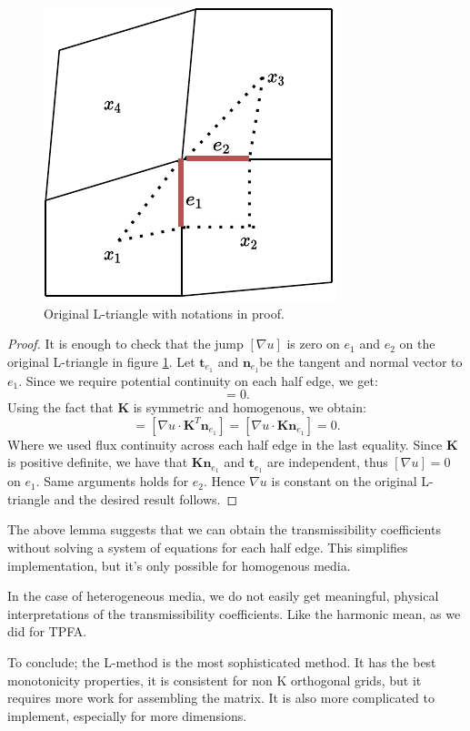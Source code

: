 \documentclass[../Main/main.tex]{subfiles}
\begin{document}
	\begin{figure}[H]
		\centering
		\includegraphics{right choice 2.pdf}	
		\caption{Original L-triangle with notations in proof.}
		\label{fig:original right choice}
	\end{figure}
	\begin{proof}
		It is enough to check that the jump $[\nabla u]$ is zero on $e_1$ and $e_2$ on the original L-triangle in figure \ref{fig:original right choice}. Let $\bm{t}_{e_1}$ and $\bm{n}_{e_1} $be the tangent and normal vector to $e_1$. Since we require potential continuity on each half edge, we get:
		\begin{equation}
			[\nabla u \cdot \bm{t}_{e_1}]=0.
		\end{equation}
		Using the fact that $\bm{K}$ is symmetric and homogenous, we obtain:
		\begin{equation}
			[\bm{K} \nabla u \cdot \bm{n}_{e_1}]=[\nabla u \cdot \bm{K}^T \bm{n}_{e_1}]=[\nabla u \cdot \bm{K}\bm{n}_{e_1}]=0.
		\end{equation}
		Where we used flux continuity across each half edge in the last equality. Since $\bm{K}$ is positive definite, we have that $\bm{K}\bm{n}_{e_1}$ and $\bm{t}_{e_1}$ are independent, thus $[\nabla u]=0$ on $e_1$. Same arguments holds for $e_2$. Hence $\nabla u$ is constant on the original L-triangle and the desired result follows.
	\end{proof}
	\begin{remark}
		The above lemma suggests that we can obtain the transmissibility coefficients without solving a system of equations for each half edge. This simplifies implementation, but it's only possible for homogenous media.
	\end{remark}
	\begin{remark}
		In the case of heterogeneous media, we do not easily get meaningful, physical interpretations of the transmissibility coefficients. Like the harmonic mean, as we did for TPFA. 
	\end{remark}
	\par 
	To conclude; the L-method is the most sophisticated method. It has the best monotonicity properties, it is consistent for non K orthogonal grids, but it requires more work for assembling the matrix. It is also more complicated to implement, especially for more dimensions.
\end{document}
